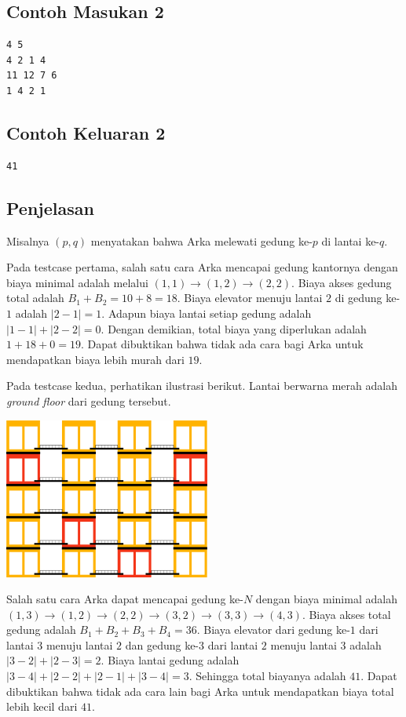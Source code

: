 \documentclass{article}
\begin{document}
\begin{multicols}{2}
\subsection*{Contoh Masukan 2}
\begin{lstlisting}
4 5
4 2 1 4
11 12 7 6
1 4 2 1
\end{lstlisting}
\columnbreak
\subsection*{Contoh Keluaran 2}
\begin{lstlisting}
41
\end{lstlisting}
\vfill
\null
\end{multicols}

\subsection*{Penjelasan}
Misalnya $(p, q)$ menyatakan bahwa Arka melewati gedung ke-$p$ di lantai ke-$q$. 

Pada testcase pertama, salah satu cara Arka mencapai gedung kantornya dengan biaya minimal adalah melalui $(1, 1) \xrightarrow{} (1, 2) \xrightarrow{} (2, 2) $. Biaya akses gedung total adalah $B_{1}+B_{2} = 10+8=18$. Biaya elevator menuju lantai $2$ di gedung ke-$1$ adalah $|2-1|=1$. Adapun biaya lantai setiap gedung adalah $|1-1|+|2-2|=0$. Dengan demikian, total biaya yang diperlukan adalah $1 + 18 + 0 = 19$. Dapat dibuktikan bahwa tidak ada cara bagi Arka untuk mendapatkan biaya lebih murah dari $19$.\newline

Pada testcase kedua, perhatikan ilustrasi berikut. Lantai berwarna merah adalah \textit{ground floor} dari gedung tersebut. 
\begin{center}
\includegraphics[height=200px]{ilustrasi-1.png}
\end{center}
Salah satu cara Arka dapat mencapai gedung ke-$N$ dengan biaya minimal adalah $(1, 3) \xrightarrow{} (1, 2) \xrightarrow{} (2, 2) \xrightarrow{} (3, 2) \xrightarrow{} (3, 3) \xrightarrow{} (4, 3)$. Biaya akses total gedung adalah $B_{1}+B_{2}+B_{3}+B_{4} = 36$. Biaya elevator dari gedung ke-$1$ dari lantai $3$ menuju lantai $2$ dan gedung ke-$3$ dari lantai $2$ menuju lantai $3$ adalah $|3-2| + |2-3| = 2$. Biaya lantai gedung adalah $|3-4| + |2-2| + |2-1| + |3-4| = 3$. Sehingga total biayanya adalah $41$. Dapat dibuktikan bahwa tidak ada cara lain bagi Arka untuk mendapatkan biaya total lebih kecil dari $41$.
\end{document}
